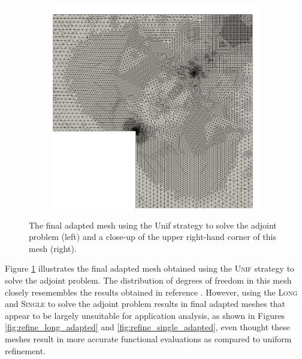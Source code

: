 \begin{figure}[ht!]
\begin{subfigure}{0.5\textwidth}
\includegraphics[width=.99\linewidth]{img/refine_squarehole_unif_close.png}
\end{subfigure}
\caption{The final adapted mesh using the Unif strategy to
solve the adjoint problem (left) and a close-up of the upper right-hand
corner of this mesh (right).}
\label{fig:refine_unif_adapted}
\end{figure}

Figure \ref{fig:refine_unif_adapted} illustrates the final adapted mesh
obtained using the \textsc{Unif} strategy to solve the adjoint problem.
The distribution of degrees of freedom in this mesh closely resemembles
the results obtained in reference \cite{dealiistep14}. However, using
the \textsc{Long} and \textsc{Single} to solve the adjoint problem
results in final adapted meshes that appear to be largely
unsuitable for application analysis, as shown in Figures
\ref{fig:refine_long_adapted} and
\ref{fig:refine_single_adapted}, even thought these meshes result
in more accurate functional evaluations as compared to uniform
refinement.

